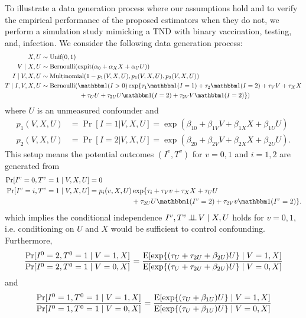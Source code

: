 \documentclass[11pt]{article}
\begin{document}
To illustrate a data generation process where our assumptions hold and to verify the empirical performance of the proposed estimators when they do not, we perform a simulation study mimicking a TND with binary vaccination, testing, and, infection. We consider the following data generation process:
\begin{align*}
    X, U &\sim \text{Unif}(0,1)\\
    V\mid X, U & \sim \text{Bernoulli}(\expit(\alpha_0 + \alpha_X X + \alpha_U U))\\
    I \mid V, X, U &\sim \text{Multinomial}(1-p_1(V, X, U), p_1(V, X, U), p_2(V, X, U))\\
    T\mid I, V, X, U &\sim \text{Bernoulli}(\mathbbm 1(I>0)\exp\{\tau_{1}\mathbbm 1(I=1) + \tau_{2}\mathbbm 1(I=2) + \tau_V V + \tau_X X \\&\qquad \qquad\qquad + \tau_U U + \tau_{2U} U \mathbbm 1(I=2) + \tau_{2V} V \mathbbm 1(I=2) \})
\end{align*}
where $U$ is an unmeasured confounder and
\begin{align*}
    p_1(V, X, U) & = \Pr[I = 1 | V, X, U] = \exp(\beta_{10} + \beta_{1V}V + \beta_{1X}X + \beta_{1U}U) \\
    p_2(V, X, U) & = \Pr[I = 2 | V, X, U] = \exp(\beta_{20} + \beta_{2V}V + \beta_{2X}X + \beta_{2U}U).
\end{align*}
This setup means the potential outcomes $(I^v, T^v)$ for $v=0,1$ and $i=1, 2$ are generated from
\begin{align*}
    \Pr[I^v=0, T^v=1\mid V, X, U] &= 0\\
    \Pr[I^v=i, T^v=1\mid V, X, U] &= p_i(v, X, U)\exp\{\tau_i + \tau_V v + \tau_X X + \tau_U U \\&\qquad \qquad\qquad + \tau_{2U}U\mathbbm 1(I^v=2) + \tau_{2V} v \mathbbm 1(I^v=2) \}.
\end{align*}
which implies the conditional independence $I^v, T^v\operatorname{\perp\!\!\!\perp} V\mid X, U$ holds for $v=0,1$, i.e. conditioning on $U$ and $X$ would be sufficient to control confounding. Furthermore, 
\begin{align*}
    \dfrac{\Pr[I^0=2, T^0=1 \mid V=1,X]}{\Pr[I^0=2, T^0=1\mid V=0,X]}=\dfrac{\operatorname{E}[\exp\{(\tau_U  + \tau_{2U}+\beta_{2U})U\}\mid V=1, X]}{\operatorname{E}[\exp\{(\tau_U  + \tau_{2U}+\beta_{2U})U\}\mid V=0, X]}
\end{align*}
and 
\begin{align*}
    \dfrac{\Pr[I^0=1, T^0=1 \mid V=1,X]}{\Pr[I^0=1, T^0=1\mid V=0,X]}=\dfrac{\operatorname{E}[\exp\{(\tau_U  +\beta_{1U})U\}\mid V=1, X]}{\operatorname{E}[\exp\{(\tau_U +\beta_{1U})U\}\mid V=0, X]}
\end{align*}
\end{document}
